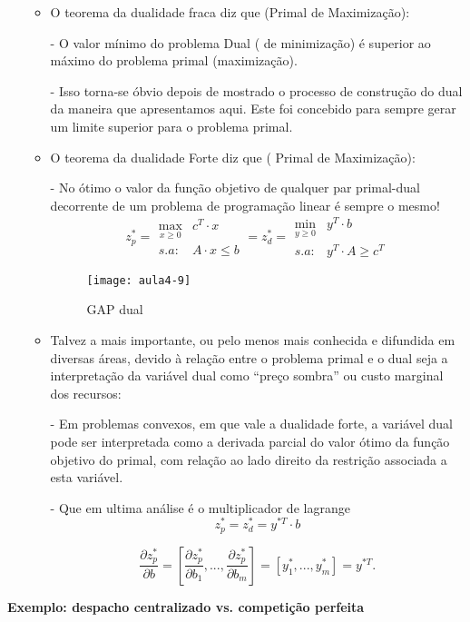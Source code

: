 \begin{enumerate}
\begin{itemize}
$$$$
\item O teorema da dualidade fraca diz que (Primal de Maximização):
\item[-]  O valor mínimo do problema Dual ( de minimização) é superior ao máximo do problema primal (maximização).
\item[-] Isso torna-se óbvio depois de mostrado o processo de construção do
dual da maneira que apresentamos aqui. Este foi concebido para sempre
gerar um limite superior para o problema primal.
\item O teorema da dualidade Forte diz que ( Primal de Maximização):
\item[-] No ótimo o valor da função objetivo de qualquer par primal-dual decorrente de um problema de programação linear é sempre o mesmo!
$$
z_{p}^{*}=\begin{array}{cc}
\max_{x\geq0} & c^{T}\cdot x\\
s.a: & A\cdot x\leq b
\end{array} = z_{d}^{*}=\begin{array}{cc}
\min_{y\geq0} & y^{T}\cdot b\\
s.a: & y^{T}\cdot A\geq c^{T}
\end{array}
$$
\begin{figure}[H]
\begin{centering}
\texttt{[image: aula4-9]}\protect\caption{\label{fig:aula4-9} GAP dual}
\end{centering}
\end{figure}
\item Talvez a mais importante, ou pelo menos mais conhecida e difundida
em diversas áreas, devido à relação entre o problema primal e o dual
seja a interpretação da variável dual como ``preço sombra'' ou custo
marginal dos recursos:
\item[-] Em problemas convexos, em que vale a dualidade forte, a variável dual pode ser interpretada como a derivada parcial do valor ótimo da função
objetivo do primal, com relação ao lado direito da restrição associada
a esta variável.
\item[-] Que em ultima análise é o multiplicador de lagrange
\[
z_{p}^{*}=z_{d}^{*}=y^{*T}\cdot b
\]


\[
\frac{\partial z_{p}^{*}}{\partial b}=\left[\frac{\partial z_{p}^{*}}{\partial b_{1}},...,\frac{\partial z_{p}^{*}}{\partial b_{m}}\right]=\left[y_{1}^{*},...,y_{m}^{*}\right]=y^{*T}.
\]

\end{itemize}
\end{enumerate}
\textbf{Exemplo: despacho centralizado vs. competição perfeita}


